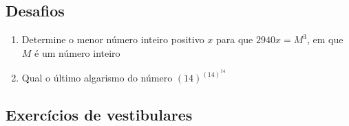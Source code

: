 \documentclass[a4paper, 11pt]{article}
\begin{document}
    \begin{center}
        \section*{Desafios}
    \end{center}

    \begin{enumerate}
        \item Determine o menor número inteiro positivo $x$ para que $2940x = M^3$, em que $M$ é um número inteiro
        \item Qual o último algarismo do número $(14)^{(14)^{14}}$
    \end{enumerate}

    \begin{center}
        \section*{Exercícios de vestibulares}
    \end{center}
\end{document}
